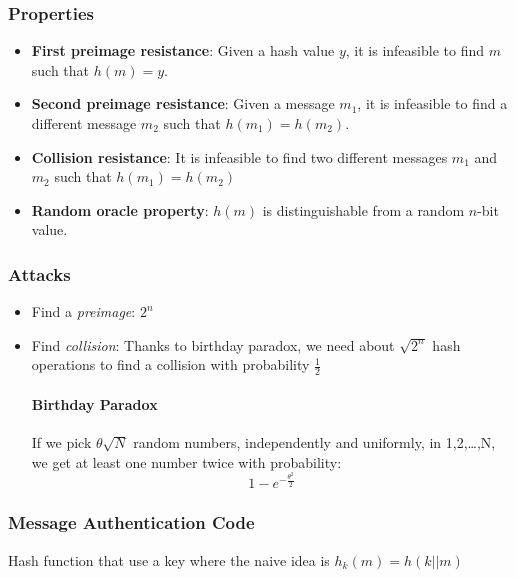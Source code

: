 \subsubsection{Properties}

\begin{itemize}
    \item \textbf{First preimage resistance}: Given a hash value $y$, it is infeasible to
        find $m$ such that $h(m) = y$.
    \item \textbf{Second preimage resistance}: Given a message $m_1$, it is infeasible
        to find a different message $m_2$ such that $h(m_1)=h(m_2)$.
    \item \textbf{Collision resistance}: It is infeasible to find two different messages
        $m_1$ and $m_2$ such that $h(m_1)=h(m_2)$
    \item \textbf{Random oracle property}: $h(m)$ is distinguishable from a
        random $n$-bit value.
\end{itemize}

\subsubsection{Attacks}
\begin{itemize}
    \item Find a \textit{preimage}: $2^n$
    \item Find \textit{collision}: Thanks to birthday paradox,
        we need about $\sqrt{2^n}$ hash operations to find a
        collision with probability $\frac{1}{2}$

        \paragraph{Birthday Paradox} If we pick $\theta\sqrt{N}$ random numbers,
        independently and uniformly, in {1,2,\ldots,N}, we get at least one number twice
        with probability:
        $$1-e^{-\frac{\theta^2}{2}}$$
\end{itemize}

\subsubsection{Message Authentication Code} 
Hash function that use a key where the naive idea is $h_k(m) = h(k||m)$

